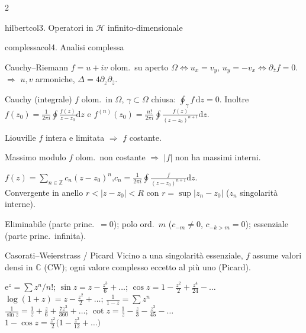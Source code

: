 \documentclass[10pt,a4paper]{article}
\newcommand{\C}{\mathbb{C}}
\newcommand{\Z}{\mathbb{Z}}
\newcommand{\dd}{\mathrm{d}}
\newcommand{\eu}{\mathrm{e}}
\begin{document}
\begin{multicols}{2}
\begin{secbox}{hilbertcol}{3. Operatori in $\mathcal H$ infinito-dimensionale}
\end{secbox}

\begin{secbox}{complessacol}{4. Analisi complessa}

\begin{teobox}{Cauchy--Riemann}
$f=u+iv$ olom.\ su aperto $\Omega\iff u_x=v_y,\,u_y=-v_x\iff\partial_{\bar z}f=0$. $\Rightarrow$ $u,v$ armoniche, $\Delta=4\partial_z\partial_{\bar z}$.
\end{teobox}

\begin{teobox}{Cauchy (integrale)}
$f$ olom.\ in $\Omega$, $\gamma\subset\Omega$ chiusa: $\oint_\gamma f\,\dd z=0$. Inoltre $f(z_0)=\frac{1}{2\pi i}\oint\frac{f(z)}{z-z_0}\dd z$ e $f^{(n)}(z_0)=\frac{n!}{2\pi i}\oint\frac{f(z)}{(z-z_0)^{n+1}}\dd z$.
\end{teobox}

\begin{teobox}{Liouville}
$f$ intera e limitata $\Rightarrow$ $f$ costante.
\end{teobox}

\begin{teobox}{Massimo modulo}
$f$ olom.\ non costante $\Rightarrow$ $|f|$ non ha massimi interni.
\end{teobox}

$f(z)=\sum_{n\in\Z}c_n(z-z_0)^n$,\;$c_n=\frac{1}{2\pi i}\oint\frac{f}{(z-z_0)^{n+1}}\dd z$.\\
Convergente in anello $r<|z-z_0|<R$ con $r=\sup|z_n-z_0|$ ($z_n$ singolarità interne).

Eliminabile (parte princ.\ $=0$); polo ord.\ $m$ ($c_{-m}\!\neq\!0$, $c_{-k>m}\!=\!0$); essenziale (parte princ.\ infinita).

\begin{teobox}{Casorati--Weierstrass / Picard}
Vicino a una singolarità essenziale, $f$ assume valori densi in $\C$ (CW); ogni valore complesso eccetto al più uno (Picard).
\end{teobox}

$\eu^z=\sum z^n/n!$; $\sin z=z-\frac{z^3}{6}+\dots$; $\cos z=1-\frac{z^2}{2}+\frac{z^4}{24}-\dots$\\
$\log(1+z)=z-\frac{z^2}{2}+\dots$; $\frac{1}{1-z}=\sum z^n$\\
$\frac{1}{\sin z}=\frac{1}{z}+\frac{z}{6}+\frac{7z^3}{360}+\dots$; $\cot z=\frac{1}{z}-\frac{z}{3}-\frac{z^3}{45}-\dots$\\
$1-\cos z=\frac{z^2}{2}\bigl(1-\frac{z^2}{12}+\dots\bigr)$


\end{secbox}
\end{multicols}
\end{document}
